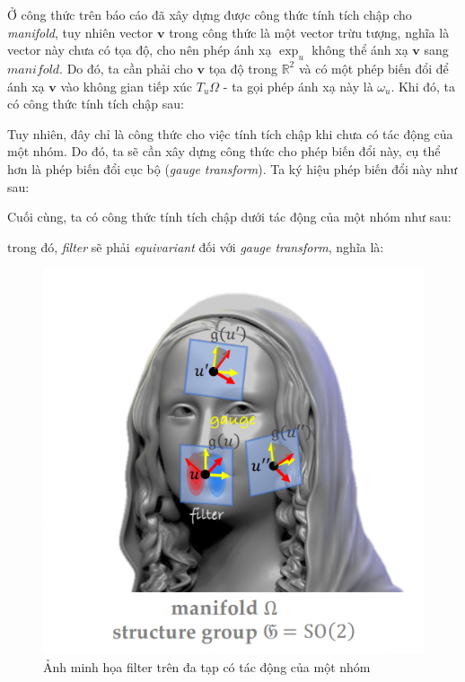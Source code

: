 Ở công thức trên báo cáo đã xây dựng được công thức tính tích chập cho \textit{manifold}, tuy nhiên vector $\mathbf{v}$ trong công thức là một vector trừu tượng, nghĩa là vector này chưa có tọa độ, cho nên phép ánh xạ $\exp_u$ không thể ánh xạ $\mathbf{v}$ sang $manifold$. Do đó, ta cần phải cho $\mathbf{v}$ tọa độ trong $\mathbb{R}^2$ và có một phép biến đổi để ánh xạ $\mathbf{v}$ vào không gian tiếp xúc $T_u \Omega$ - ta gọi phép ánh xạ này là $\omega_u$. Khi đó, ta có công thức tính tích chập sau:
\begin{center}
    \vspace{-0.5cm}
\end{center}
\vspace{-0.5cm}
Tuy nhiên, đây chỉ là công thức cho việc tính tích chập khi chưa có tác động của một nhóm. Do đó, ta sẽ cần xây dựng công thức cho phép biến đổi này, cụ thể hơn là phép biến đổi cục bộ (\textit{gauge transform}). Ta ký hiệu phép biến đổi này như sau:
\begin{center}
    \vspace{-0.5cm}
\end{center}
\vspace{-0.5cm}
Cuối cùng, ta có công thức tính tích chập dưới tác động của một nhóm như sau:
\begin{center}
\end{center}
trong đó, \textit{filter} sẽ phải \textit{equivariant} đối với \textit{gauge transform}, nghĩa là:
\begin{center}
\end{center}
\begin{figure}[H]
    \centering
    \includegraphics[width=0.7\linewidth]{Images/GDL/manifold_mesh/mani_cnn/mani_cnn.png}
    \caption{Ảnh minh họa filter trên đa tạp có tác động của một nhóm\cite{geometricdeep2022}}
\end{figure}

